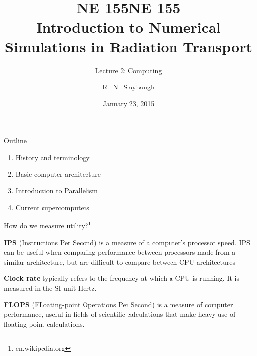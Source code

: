 \documentclass[xcolor=x11names,compress]{beamer}
\title{NE 155}
\author{R.\ N.\ Slaybaugh}
\date{January 23, 2015}
\renewcommand{\(}{\begin{columns}}
\renewcommand{\)}{\end{columns}}
\newcommand{\<}[1]{\begin{column}{#1}}
\renewcommand{\>}{\end{column}}
\begin{document}
\begin{frame}
\title{NE 155\\Introduction to Numerical Simulations in Radiation Transport}
\subtitle{Lecture 2: Computing}
\titlepage
\end{frame}

\begin{frame}{Outline}
\begin{enumerate}
\item History and terminology
\item Basic computer architecture
\item Introduction to Parallelism
\item Current supercomputers
\end{enumerate}
\end{frame}

\begin{frame}{How do we measure utility?\footnote{en.wikipedia.org}}

\textbf{IPS} (Instructions Per Second) is a measure of a computer's processor speed. IPS can be useful when comparing performance between processors made from a similar architecture, but are difficult to compare between CPU architectures

\vspace*{1 em}
\textbf{Clock rate} typically refers to the frequency at which a CPU is running. It is measured in the SI unit Hertz.

\vspace*{1 em}
\textbf{FLOPS} (FLoating-point Operations Per Second) is a measure of computer performance, useful in fields of scientific calculations that make heavy use of floating-point calculations. 
\end{frame}
\end{document}
